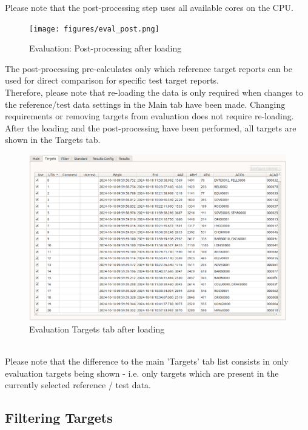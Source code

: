 Please note that the post-processing step uses all available cores on the CPU.

\begin{figure}[H]
  \centering 
    \texttt{[image: figures/eval\_post.png]}
  \caption{Evaluation: Post-processing after loading}
\end{figure}

The post-processing pre-calculates only which reference target reports can be used for direct comparison for specific test target reports. \\

Therefore, please note that re-loading the data is only required when changes to the reference/test data settings in the Main tab have been made. Changing requirements or removing targets from evaluation does not require re-loading. \\

After the loading and the post-processing have been performed, all targets are shown in the Targets tab.

\begin{figure}[H]
  \hspace*{-2cm}
    \includegraphics[width=18cm,frame]{figures/eval_targets_loaded.png}
  \caption{Evaluation Targets tab after loading}
\end{figure}
\ \\

Please note that the difference to the main 'Targets' tab list consists in only evaluation targets being shown - i.e. only targets which are present in the currently selected reference / test data.

\subsection{Filtering Targets}
\label{sec:eval_filter_targets} 

